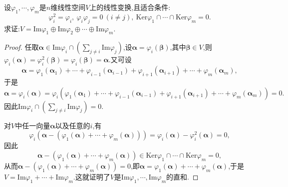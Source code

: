 \documentclass[../../main.tex]{subfiles}%
\begin{document}
\begin{proposition}\label{proposition:由投影变换性质反推直和分解}
设\(\varphi_1,\cdots,\varphi_m\)是\(n\)维线性空间\(V\)上的线性变换,且适合条件:
\[
\varphi_i^2 = \varphi_i,\ \varphi_i\varphi_j = 0\ (i\neq j),\ \text{Ker}\varphi_1\cap\cdots\cap\text{Ker}\varphi_m = 0.
\]
求证:\(V = \text{Im}\varphi_1\oplus\text{Im}\varphi_2\oplus\cdots\oplus\text{Im}\varphi_m\).
\end{proposition}
\begin{proof}
任取\(\boldsymbol{\alpha}\in\text{Im}\varphi_i\cap(\sum_{j\neq i}\text{Im}\varphi_j)\),设\(\boldsymbol{\alpha}=\varphi_i(\boldsymbol{\beta})\),其中\(\boldsymbol{\beta}\in V\),则\(\varphi_i(\boldsymbol{\alpha})=\varphi_i^2(\boldsymbol{\beta})=\varphi_i(\boldsymbol{\beta})=\boldsymbol{\alpha}\).又可设
\[
\boldsymbol{\alpha}=\varphi_1(\boldsymbol{\alpha}_1)+\cdots+\varphi_{i - 1}(\boldsymbol{\alpha}_{i - 1})+\varphi_{i + 1}(\boldsymbol{\alpha}_{i + 1})+\cdots+\varphi_m(\boldsymbol{\alpha}_m),
\]
于是
\[
\boldsymbol{\alpha}=\varphi_i(\boldsymbol{\alpha})=\varphi_i(\varphi_1(\boldsymbol{\alpha}_1)+\cdots+\varphi_{i - 1}(\boldsymbol{\alpha}_{i - 1})+\varphi_{i + 1}(\boldsymbol{\alpha}_{i + 1})+\cdots+\varphi_m(\boldsymbol{\alpha}_m)) = 0.
\]
因此\(\text{Im}\varphi_i\cap(\sum_{j\neq i}\text{Im}\varphi_j)=0\).

对\(V\)中任一向量\(\boldsymbol{\alpha}\)以及任意的\(i\),有
\[
\varphi_i(\boldsymbol{\alpha}-(\varphi_1(\boldsymbol{\alpha})+\cdots+\varphi_m(\boldsymbol{\alpha})))=\varphi_i(\boldsymbol{\alpha})-\varphi_i^2(\boldsymbol{\alpha}) = 0,
\]
因此
\[
\boldsymbol{\alpha}-(\varphi_1(\boldsymbol{\alpha})+\cdots+\varphi_m(\boldsymbol{\alpha}))\in\text{Ker}\varphi_1\cap\cdots\cap\text{Ker}\varphi_m = 0,
\]
从而\(\boldsymbol{\alpha}-(\varphi_1(\boldsymbol{\alpha})+\cdots+\varphi_m(\boldsymbol{\alpha})) = 0\),即\(\boldsymbol{\alpha}=\varphi_1(\boldsymbol{\alpha})+\cdots+\varphi_m(\boldsymbol{\alpha})\),于是\(V=\text{Im}\varphi_1+\cdots+\text{Im}\varphi_m\).这就证明了\(V\)是\(\text{Im}\varphi_1,\cdots,\text{Im}\varphi_m\)的直和.
\end{proof}
\end{document}
